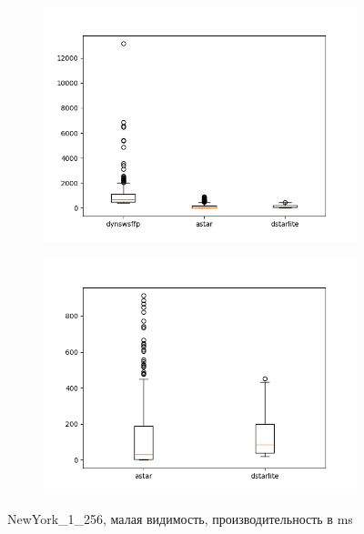 \documentclass[11pt]{article}
\begin{document}
    \begin{figure}
        \centering
        \begin{subfigure}[b]{0.48\textwidth}
            \centering
            \includegraphics[width=\textwidth]{../plots/r5/NewYork_1_256-('dynswsffp', 'astar', 'dstarlite').png}
        \end{subfigure}
        \hfill
        \begin{subfigure}[b]{0.48\textwidth}
            \centering
            \includegraphics[width=\textwidth]{../plots/r5/NewYork_1_256-('astar', 'dstarlite').png}
        \end{subfigure}
        \caption{NewYork\_1\_256, малая видимость, производительность в ms}
        \label{fig: NewYork_1_256-r5}
    \end{figure}
\end{document}
